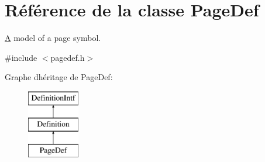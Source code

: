 \hypertarget{class_page_def}{}\section{Référence de la classe Page\+Def}
\label{class_page_def}


\hyperlink{class_a}{A} model of a page symbol.  




{\ttfamily \#include $<$pagedef.\+h$>$}

Graphe d\textquotesingle{}héritage de Page\+Def\+:\begin{figure}[H]
\begin{center}
\leavevmode
\includegraphics[height=3.000000cm]{class_page_def}
\end{center}
\end{figure}
